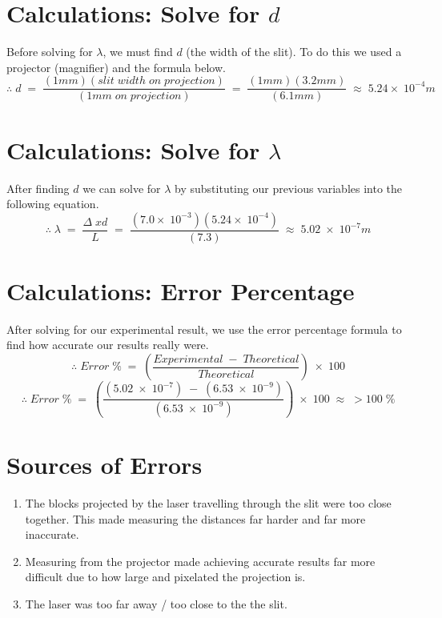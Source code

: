\documentclass{article}
\begin{document}
\section*{Calculations: Solve for $d$} {
    Before solving for $\lambda$, we must find $d$ (the width of the slit). To do this we used a projector (magnifier) and the formula below.\newline\newline
    \begin{equation*}
        \therefore\;d\;=\;\frac{(1mm)(slit\;width\;on\;projection)}{(1mm\;on\;projection)}\;=\;\frac{(1mm)(3.2mm)}{(6.1mm)}\;\approx\;5.24\times\;10^{-4}m
    \end{equation*}\leavevmode\newline
}
\section*{Calculations: Solve for $\lambda$} {
    After finding $d$ we can solve for $\lambda$ by substituting our previous variables into the following equation.\newline\newline
    \begin{equation*}
        \therefore\;\lambda\;=\;\frac{\Delta\;xd}{L}\;=\;\frac{(7.0\times\;10^{-3})(5.24\times\;10^{-4})}{(7.3)}\;\approx\;5.02\;\times\;10^{-7}m
    \end{equation*}\leavevmode\newline
}
\section*{Calculations: Error Percentage} {
    After solving for our experimental result, we use the error percentage formula to find how accurate our results really were.
    \begin{equation*}
        \therefore\;Error\;\%\;=\;\left(\frac{Experimental\;-\;Theoretical}{Theoretical}\right)\;\times\;100
    \end{equation*}\leavevmode
    \begin{equation*}
        \therefore\;Error\;\%\;=\;\left(\frac{(5.02\;\times\;10^{-7})\;-\;(6.53\;\times\;10^{-9})}{(6.53\;\times\;10^{-9})}\right)\;\times\;100\;\approx\; >100\;\%
    \end{equation*}
}
\section*{Sources of Errors} {
    \begin{enumerate}
        \item {The blocks projected by the laser travelling through the slit were too close together. This made measuring the distances far harder and far more inaccurate.}
        \item {Measuring from the projector made achieving accurate results far more difficult due to how large and pixelated the projection is.}
        \item {The laser was too far away / too close to the the slit.}
    \end{enumerate}\leavevmode
}
\end{document}
